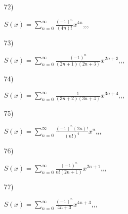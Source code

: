 \documentclass[11pt, ukrainian]{article}
\begin{document}
72) \space 
{%
{$S(x)=\sum\limits_{n=0}^{\infty}{\frac{(-1)^n}{(4n)!}}{x^{{4n}}}$},,, \par \smallskip  
}
\par
\vspace{0.9cm}
73) \space 
{%
{$S(x)=\sum\limits_{n=0}^{\infty}{\frac{(-1)^n}{(2n+1)(2n+3)}}{x^{{2n+3}}}$},,, \par \smallskip  
}
\par
\vspace{0.9cm}
74) \space 
{%
{$S(x)=\sum\limits_{n=0}^{\infty}{\frac{1}{(3n+2)(3n+4)}}{x^{{3n+4}}}$},,, \par \smallskip  
}
\par
\vspace{0.9cm}
75) \space 
{%
{$S(x)=\sum\limits_{n=0}^{\infty}{\frac{{(-1)^n}(2n)!}{(n!)^4}}{x^{{n}}}$},,, \par \smallskip  
}
\par
\vspace{0.9cm}
76) \space 
{%
{$S(x)=\sum\limits_{n=0}^{\infty}{\frac{(-1)^n}{n!(2n+1)}}{x^{{2n+1}}}$},,, \par \smallskip  
}
\par
\vspace{0.9cm}
77) \space 
{%
{$S(x)=\sum\limits_{n=0}^{\infty}{\frac{(-1)^n}{4n+3}}{x^{{4n+3}}}$},,, \par \smallskip  
}
\end{document}
